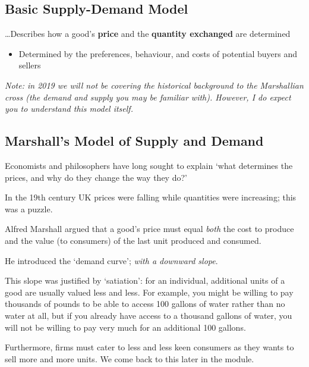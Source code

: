 \documentclass[]{article}
\providecommand{\tightlist}{%
  \setlength{\itemsep}{0pt}\setlength{\parskip}{0pt}}
\begin{document}
\hypertarget{basic-supply-demand-model}{%
\subsection{Basic Supply-Demand Model}\label{basic-supply-demand-model}}

\ldots{}Describes how a good's \textbf{price} and the \textbf{quantity exchanged} are determined

\begin{itemize}
\tightlist
\item
  Determined by the preferences, behaviour, and costs of potential buyers and sellers
\end{itemize}

\emph{Note: in 2019 we will not be covering the historical background to the Marshallian cross (the demand and supply you may be familiar with). However, I do expect you to understand this model itself.}

\hypertarget{marshalls-model-of-supply-and-demand}{%
\subsection{Marshall's Model of Supply and Demand}\label{marshalls-model-of-supply-and-demand}}

Economists and philosophers have long sought to explain `what determines the prices, and why do they change the way they do?'

In the 19th century UK prices were falling while quantities were increasing; this was a puzzle.

Alfred Marshall argued that a good's price must equal \emph{both} the cost to produce and the value (to consumers) of the last unit produced and consumed.

He introduced the `demand curve'; \emph{with a downward slope}.

This slope was justified by `satiation': for an individual, additional units of a good are usually valued less and less. For example, you might be willing to pay thousands of pounds to be able to access 100 gallons of water rather than no water at all, but if you already have access to a thousand gallons of water, you will not be willing to pay very much for an additional 100 gallons.

Furthermore, firms must cater to less and less keen consumers as they wants to sell more and more units. We come back to this later in the module.

\bigskip
\end{document}
